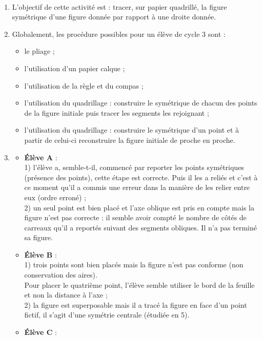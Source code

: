 \begin{corrige}
\ \\ [-5mm]
\begin{enumerate}
   \item L'objectif de cette activité est : tracer, sur papier quadrillé, la figure symétrique d'une figure donnée par rapport à une droite donnée.
   \item Globalement, les procédure possibles pour un élève de cycle 3 sont :
   \begin{itemize}
      \item le pliage ;
      \item l'utilisation d'un papier calque ;
      \item l'utilisation de la règle et du compas ;
      \item l'utilisation du quadrillage : construire le symétrique de chacun des points de la figure initiale puis tracer les segments les rejoignant ;
      \item l'utilisation du quadrillage : construire le symétrique d'un point et à partir de celui-ci reconstruire la figure initiale de proche en proche.
\end{itemize}
    \item 
    \begin{itemize}
       \item {\bf Élève A} : \\
       1) l'élève a, semble-t-il, commencé par reporter les points symétriques (présence des points), cette étape est correcte. Puis il les a reliés et c'est à ce moment qu'il a commis une erreur dans la manière de les relier entre eux (ordre erroné) ; \\
       2) un seul point est bien placé et l'axe oblique est pris en compte mais la figure n'est pas correcte : il semble avoir compté le nombre de côtés de carreaux qu'il a reportés suivant des segments obliques. Il n'a pas terminé sa figure.
       \item {\bf Élève B} : \\
       1) trois points sont bien placés mais la figure n'est pas conforme (non conservation des aires). \\
       Pour placer le quatrième point, l'élève semble utiliser le bord de la feuille et non la distance à l'axe ; \\
       2) la figure est superposable mais il a tracé la figure \og en face \fg{} d'un point fictif, il s'agit d'une symétrie centrale (étudiée en 5).
       \item {\bf Élève C} : \\

\end{itemize}
\end{enumerate}
\end{corrige}
